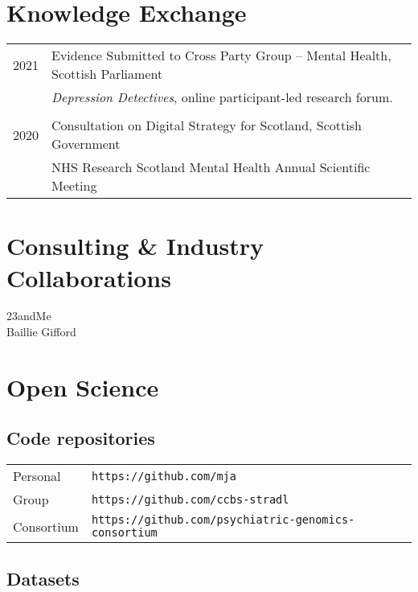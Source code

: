 \documentclass[11pt]{article}
\begin{document}
\section*{Knowledge Exchange}

\begin{tabular}{p{3cm}p{12cm}}

2021 & Evidence Submitted to Cross Party Group -- Mental Health, Scottish Parliament \\
      & \emph{Depression Detectives}, online participant-led research forum.\\ \\
2020 & Consultation on Digital Strategy for Scotland, Scottish Government \\
     & NHS Research Scotland Mental Health Annual Scientific Meeting \\

\end{tabular}

\section*{Consulting \& Industry Collaborations}

23andMe \\
Baillie Gifford

\section*{Open Science}

\subsection*{Code repositories}

\begin{tabular}{p{3cm}p{12cm}}

Personal &  \texttt{https://github.com/mja} \\
Group &  \texttt{https://github.com/ccbs-stradl} \\
Consortium & \texttt{https://github.com/psychiatric-genomics-consortium}

\end{tabular}

\subsection*{Datasets}

\printbibliography[type=misc,heading=none]
\end{document}
